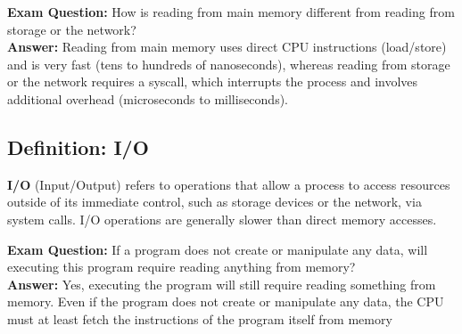 \vspace{0.5em}
{\color{red}\textbf{Exam Question:} How is reading from main memory different from reading from storage or the network?}\\[0.5em]
\textbf{Answer:} Reading from main memory uses direct CPU instructions (load/store) and is very fast (tens to hundreds of nanoseconds), whereas reading from storage or the network requires a syscall, which interrupts the process and involves additional overhead (microseconds to milliseconds).

\subsection{Definition: I/O}

\begin{definition}[I/O]
\textbf{I/O} (Input/Output) refers to operations that allow a process to access resources outside of its immediate control, such as storage devices or the network, via system calls. I/O operations are generally slower than direct memory accesses.
\end{definition}
{\color{red}\textbf{Exam Question:} If a program does not create or manipulate any data, will executing this program require reading anything from memory?}\\[0.5em]
\textbf{Answer:} Yes, executing the program will still require reading something from memory. Even if the program does not create or manipulate any data, the CPU must at least fetch the instructions of the program itself from memory
\newpage
